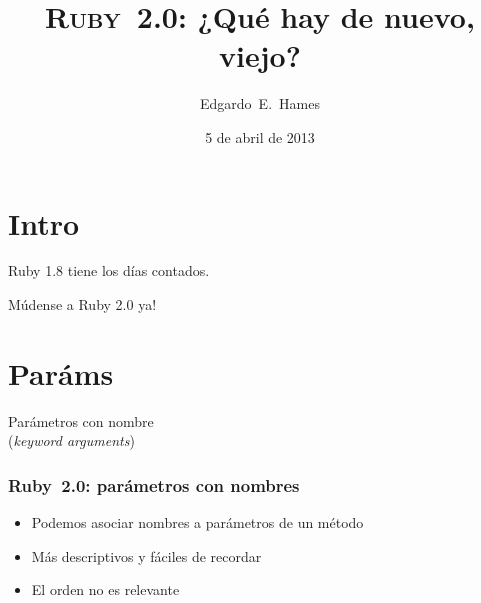 \documentclass[compress]{beamer}
\title[Lo nuevo en Ruby 2.0]
{\textsc{Ruby~2.0}: ¿Qué hay de nuevo, viejo?}
\author[Edgardo~E.~Hames] {Edgardo~E.~Hames}
\institute{ehames}
\date{5 de abril de 2013}
\begin{document}

\section{}

\begin{frame}
  \titlepage{}
\end{frame}

\section{Intro}


\begin{frame}
	\begin{center}
		Ruby 1.8 tiene los días contados.
	\end{center}
\end{frame}

\begin{frame}
	\begin{center}
		Múdense a Ruby 2.0 ya!
	\end{center}
\end{frame}

\section{Paráms}

\begin{frame}
	\begin{center}
		Parámetros con nombre\\
		(\emph{keyword arguments})
	\end{center}
\end{frame}

\begin{frame}
\frametitle{Ruby~2.0: parámetros con nombres}
	\begin{itemize}
		\item Podemos asociar nombres a parámetros de un método
		\item Más descriptivos y fáciles de recordar
		\item El orden no es relevante
	\end{itemize}
\end{frame}
\end{document}
